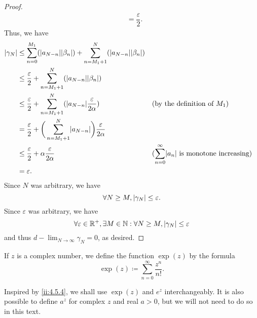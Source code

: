 \begin{proof}
\begin{align*}
                                                       & = \dfrac{\varepsilon}{2}.
  \end{align*}
  Thus, we have
  \begin{align*}
    \abs{\gamma_N} & \leq \sum_{n = 0}^{M_1} (\abs{a_{N - n}} \abs{\beta_n}) + \sum_{n = M_1 + 1}^N (\abs{a_{N - n}} \abs{\beta_n})                                                                        \\
                   & \leq \dfrac{\varepsilon}{2} + \sum_{n = M_1 + 1}^N (\abs{a_{N - n}} \abs{\beta_n})                                                                                                    \\
                   & \leq \dfrac{\varepsilon}{2} + \sum_{n = M_1 + 1}^N (\abs{a_{N - n}} \dfrac{\varepsilon}{2 \alpha})             &  & \text{(by the definition of \(M_1\))}                             \\
                   & = \dfrac{\varepsilon}{2} + \bigg(\sum_{n = M_1 + 1}^N \abs{a_{N - n}}\bigg) \dfrac{\varepsilon}{2 \alpha}                                                                             \\
                   & \leq \dfrac{\varepsilon}{2} + \alpha \dfrac{\varepsilon}{2 \alpha}                                             &  & \text{(\(\sum_{n = 0}^\infty \abs{a_n}\) is monotone increasing)} \\
                   & = \varepsilon.
  \end{align*}
  Since \(N\) was arbitrary, we have
  \[
    \forall N \geq M, \left\lvert\gamma_N\right\rvert \leq \varepsilon.
  \]
  Since \(\varepsilon\) was arbitrary, we have
  \[
    \forall \varepsilon \in \mathbb{R}^+, \exists M \in \mathbb{N} : \forall N \geq M, \left\lvert\gamma_N\right\rvert \leq \varepsilon
  \]
  and thus \(d - \lim_{N \to \infty} \gamma_N = 0\), as desired.
\end{proof}

\begin{defn}\label{ii:4.6.15}
  If \(z\) is a complex number, we define the function \(\exp(z)\) by the formula
  \[
    \exp(z) \coloneqq \sum_{n = 0}^\infty \dfrac{z^n}{n!}.
  \]
\end{defn}

\begin{note}
  Inspired by \cref{ii:4.5.4}, we shall use \(\exp(z)\) and \(e^z\) interchangeably.
  It is also possible to define \(a^z\) for complex \(z\) and real \(a > 0\), but we will not need to do so in this text.
\end{note}

